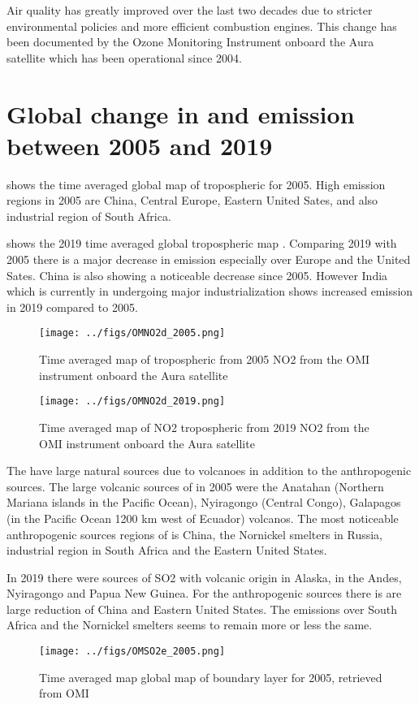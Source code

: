 Air quality has greatly improved over the last two decades due to stricter environmental
policies and more efficient combustion engines. This change has been documented by the 
Ozone Monitoring Instrument onboard the Aura satellite which has been operational since 2004.   
\section*{Global change in  and  emission between 2005 and 2019} 
 shows the time averaged global map of tropospheric 
 for 2005. High emission regions in 2005 are  
China, Central Europe, Eastern United Sates, and also industrial region of South Africa. 

 shows the 2019 time averaged global tropospheric
map  . Comparing 2019 with 2005 there is a major 
decrease in  emission especially over Europe and the United Sates. China is also 
showing a noticeable decrease since 2005. However India which is currently in undergoing 
major industrialization shows increased  emission in 2019 compared to 2005. 

\begin{figure}[htbp]
    \centering
        \texttt{[image: ../figs/OMNO2d\_2005.png]}
    \caption{Time averaged map of  tropospheric from 2005 NO2 from the OMI instrument
    onboard the Aura satellite   }
    \label{fig:OMI_global_2005NO2}
\end{figure}

\begin{figure}[htpb]
    \centering
        \texttt{[image: ../figs/OMNO2d\_2019.png]}
    \caption{Time averaged map of NO2 tropospheric from 2019 NO2 from the OMI instrument  
    onboard the Aura satellite}
    \label{fig:OMI_global_2019NO2}
\end{figure}

The  have large natural sources due to volcanoes in addition to the
anthropogenic sources. The large volcanic sources of  
in 2005  were the Anatahan (Northern Mariana 
islands in the Pacific Ocean), Nyiragongo (Central Congo), Galapagos 
(in the Pacific Ocean 1200 km west of Ecuador) volcanos. The most 
noticeable anthropogenic sources regions of  is China, the 
Nornickel smelters in Russia, industrial region in South Africa and the 
Eastern United States.   

In 2019 there were sources of SO2 with volcanic origin in Alaska, in the 
Andes, Nyiragongo and Papua New Guinea. For the anthropogenic sources 
there is are large reduction of China and Eastern United States. The  emissions over South Africa and the Nornickel smelters seems to remain more or less the same. 
\begin{figure}[htbp]
    \centering
        \texttt{[image: ../figs/OMSO2e\_2005.png]}
    \caption{Time averaged map global map of boundary layer  for 2005, retrieved from OMI}
    \label{fig:OMI_global_2005SO2}
\end{figure}


